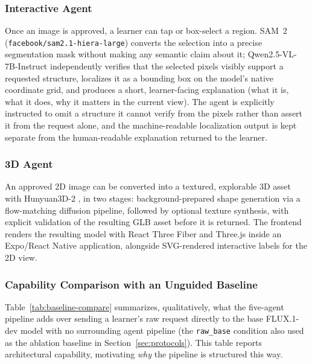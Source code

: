 \documentclass[conference]{IEEEtran}
\begin{document}
\subsubsection{Interactive Agent}
Once an image is approved, a learner can tap or box-select a region. SAM~2 \cite{sam2} (\texttt{facebook/sam2.1-hiera-large}) converts the selection into a precise segmentation mask without making any semantic claim about it; Qwen2.5-VL-7B-Instruct \cite{qwen25vl} independently verifies that the selected pixels visibly support a requested structure, localizes it as a bounding box on the model's native coordinate grid, and produces a short, learner-facing explanation (what it is, what it does, why it matters in the current view). The agent is explicitly instructed to omit a structure it cannot verify from the pixels rather than assert it from the request alone, and the machine-readable localization output is kept separate from the human-readable explanation returned to the learner.

\subsubsection{3D Agent}
An approved 2D image can be converted into a textured, explorable 3D asset with Hunyuan3D-2 \cite{hunyuan3d}, in two stages: background-prepared shape generation via a flow-matching diffusion pipeline, followed by optional texture synthesis, with explicit validation of the resulting GLB asset before it is returned. The frontend renders the resulting model with React Three Fiber and Three.js inside an Expo/React Native application, alongside SVG-rendered interactive labels for the 2D view.

\subsubsection{Capability Comparison with an Unguided Baseline}
Table~\ref{tab:baseline-compare} summarizes, qualitatively, what the five-agent pipeline adds over sending a learner's raw request directly to the base FLUX.1-dev model with no surrounding agent pipeline (the \texttt{raw\_base} condition also used as the ablation baseline in Section~\ref{sec:protocols}). This table reports architectural capability, motivating \emph{why} the pipeline is structured this way.
\end{document}
